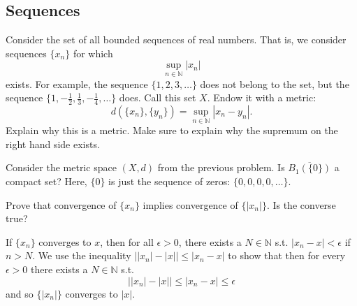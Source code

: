 \subsection{Sequences}

  \begin{exercise}
    Consider the set of all bounded sequences of real numbers. That is, we
    consider sequences $\{x_n\}$ for which
    \begin{equation}
      \sup_{n\in\mathbb{N}} |x_n|
    \end{equation}
    exists. For example, the sequence $\{1,2,3,\ldots\}$ does not belong to the set,
    but the sequence $\{1,-\frac{1}{2},\frac{1}{3},-\frac{1}{4},\ldots\}$ does. Call this set $X$. Endow it with
    a metric:
    \begin{equation}
      d(\{x_n\},\{y_n\}) = \sup_{n\in\mathbb{N}} |x_n - y_n|.
    \end{equation}
    Explain why this is a metric. Make sure to explain why the supremum on
    the right hand side exists.
  \end{exercise}

  \begin{exercise}
    Consider the metric space $(X,d)$ from the previous problem. Is $\overline{B_1(\{0\})}$
    a compact set? Here, $\{0\}$ is just the sequence of zeros: $\{0,0,0,0,\ldots\}$.
  \end{exercise}
  
  \begin{exercise}[Rudin 3.1]
    Prove that convergence of $\{x_n\}$ implies convergence of $\{|x_n|\}$. Is the converse true? 
  \end{exercise}
  \begin{solution}
    If $\{x_n\}$ converges to $x$, then for all $\epsilon > 0$, there exists a $N \in \mathbb{N}$ s.t. $|x_n - x| < \epsilon$ if $n > N$. We use the inequality $\big| |x_n| - |x| \big| \leq |x_n - x|$ to show that then for every $\epsilon > 0$ there exists a $N \in \mathbb{N}$ s.t. 
    \[ \big| |x_n| - |x| \big| \leq |x_n - x| \leq \epsilon \]
    and so $\{|x_n|\}$ converges to $|x|$. 
  \end{solution}

